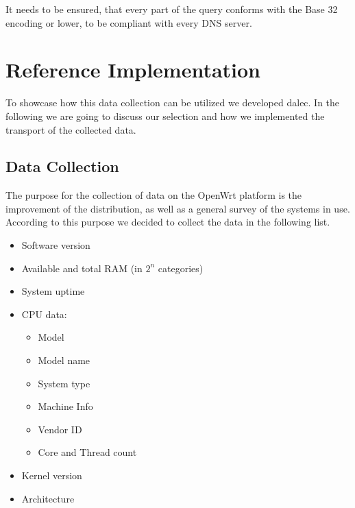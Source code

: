         It needs to be ensured, that every part of the query conforms with the Base 32 encoding or lower, to be compliant with every DNS server\cite{mockapetris_domain_1987}.

\newpage


\section{Reference Implementation}
\label{sec:software_design:ref_impl}
    To showcase how this data collection can be utilized we developed dalec\cite{venz_ikstreamdalec_2021}.
    In the following we are going to discuss our selection and how we implemented the transport of the collected data.
%
\subsection{Data Collection}
    The purpose for the collection of data on the OpenWrt platform is the improvement of the distribution, as well as a general survey of the systems in use. According to this purpose we decided to collect the data in the following list. 
    \begin{itemize}
        \item Software version
        \item Available and total RAM (in $2^n$ categories)
        \item System uptime
        \item CPU data:
        \begin{itemize}
            \item Model
            \item Model name
            \item System type
            \item Machine Info
            \item Vendor ID
            \item Core and Thread count
        \end{itemize}
        \item Kernel version
        \item Architecture
    \end{itemize}
    
